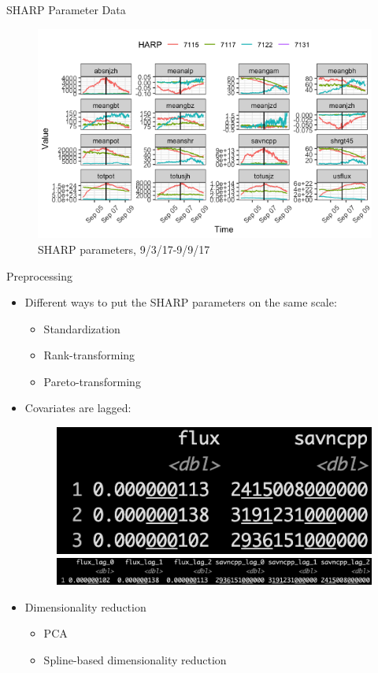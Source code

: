 \documentclass{beamer}
\begin{document}
\begin{frame}{SHARP Parameter Data}
    \begin{figure}
        \centering
        \includegraphics[scale=0.55]{sharp_params_20170906.png}
        \caption{SHARP parameters, 9/3/17-9/9/17}
        \label{fig:sharp_params_20170906}
    \end{figure}
\end{frame}

\begin{frame}{Preprocessing}
    \begin{itemize}
        \item Different ways to put the SHARP parameters on the same scale:
        \begin{itemize}
            \item Standardization
            \item Rank-transforming
            \item Pareto-transforming
        \end{itemize}
        \item Covariates are lagged:
        \begin{figure}
            \centering
            \includegraphics[scale=0.4]{unlagged_vars.png}
            \includegraphics[scale=0.4]{lagged_vars.png}
        \end{figure}
        \item Dimensionality reduction
        \begin{itemize}
            \item PCA
            \item Spline-based dimensionality reduction 
        \end{itemize}
    \end{itemize}
\end{frame}
\end{document}

